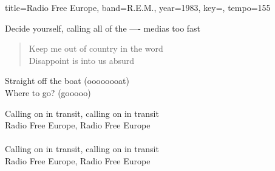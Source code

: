 \documentclass{skrul-leadsheet}
\begin{document}
\begin{song}[transpose-capo=true]{title={Radio Free Europe}, band={R.E.M.}, year={1983}, key={}, tempo={155}}
\begin{bridge}
Decide yourself, calling all of the ---- medias too fast
\end{bridge}

\begin{verse}
Keep me out of country in the word \\
Disappoint is into us absurd
\end{verse}

\begin{prechorus}
Straight off the boat (oooooooat) \\
Where to go? (gooooo)
\end{prechorus}

\begin{chorus}
Calling on in transit, calling on in transit \\
Radio Free Europe, Radio Free Europe \\
\\
Calling on in transit, calling on in transit \\
Radio Free Europe, Radio Free Europe
\end{chorus}

\end{song}
\end{document}
